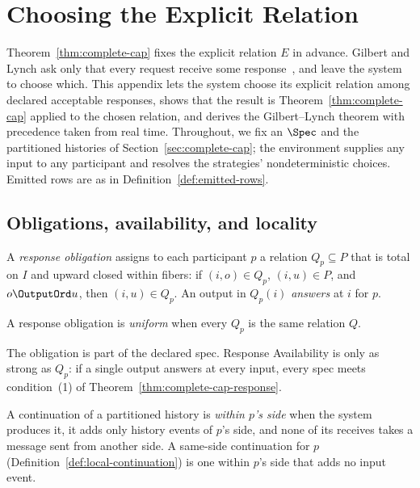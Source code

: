 \section{Choosing the Explicit Relation}
\label{app:cap-response}

Theorem~\ref{thm:complete-cap} fixes the explicit relation $E$ in advance.
Gilbert and Lynch ask only that every request receive some
response~\cite{gilbert2002cap}, and leave the system to choose which.  This
appendix lets the system choose its explicit relation among declared
acceptable responses, shows that the result is Theorem~\ref{thm:complete-cap}
applied to the chosen relation, and derives the Gilbert--Lynch theorem with
precedence taken from real time.  Throughout, we fix an \spectype $\Spec$ and the partitioned histories of
Section~\ref{sec:complete-cap}; the environment supplies any input to any
participant and resolves the strategies' nondeterministic choices.  Emitted
rows are as in Definition~\ref{def:emitted-rows}.

\subsection{Obligations, availability, and locality}

\begin{definition}
\label{def:response-obligation}
A \emph{response obligation} assigns to each participant $p$ a relation
$Q_p\subseteq P$ that is total on $I$ and upward closed within fibers: if
$(i,o)\in Q_p$, $(i,u)\in P$, and $o\OutputOrd u$, then $(i,u)\in Q_p$.  An
output in $Q_p(i)$ \emph{answers} at $i$ for $p$.
\end{definition}

\begin{definition}
\label{def:uniform-obligation}
A response obligation is \emph{uniform} when every $Q_p$ is the same
relation $Q$.
\end{definition}

The obligation is part of the declared spec.  Response Availability is only
as strong as $Q_p$: if a single output answers at every input, every spec
meets condition~(1) of Theorem~\ref{thm:complete-cap-response}.

A continuation of a partitioned history is \emph{within $p$'s side} when
the system produces it, it adds only history events of $p$'s side, and none of its
receives takes a message sent from another side.  A same-side continuation
for $p$ (Definition~\ref{def:local-continuation}) is one within $p$'s side
that adds no input event.

